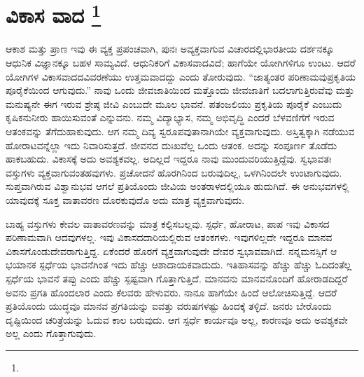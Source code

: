 
\chapter[ವಿಕಾಸ ವಾದ ]{ವಿಕಾಸ ವಾದ \protect\footnote{}}

ಆಕಾಶ ಮತ್ತು ಪ್ರಾಣ ಇವು ಈ ವ್ಯಕ್ತ ಪ್ರಪಂಚವಾಗಿ, ಪುನಃ ಅವ್ಯಕ್ತವಾಗುವ ವಿಚಾರದಲ್ಲಿ\break ಭಾರತೀಯ ದರ್ಶನಕ್ಕೂ ಆಧುನಿಕ ವಿಜ್ಞಾನಕ್ಕೂ ಬಹಳ ಸಾಮ್ಯವಿದೆ. ಆಧುನಿಕರಿಗೆ ವಿಕಾಸ\-ವಾದವಿದೆ; ಹಾಗೆಯೇ ಯೋಗಿಗಳಿಗೂ ಉಂಟು. ಆದರೆ ಯೋಗಿಗಳ ವಿಕಾಸವಾದದ\break ವಿವರಣೆಯು ಉತ್ತಮವಾದದ್ದು ಎಂದು ತೋರುವುದು. “ಜಾತ್ಯಂತರ ಪರಿಣಾಮವು\break ಪ್ರಕೃತಿಯ ಪೂರೈಕೆಯಿಂದ ಆಗುವುದು.” ನಾವು ಒಂದು ಜೀವಜಾತಿಯಿಂದ ಮತ್ತೊಂದು ಜೀವಜಾತಿಗೆ ಬದಲಾಗುತ್ತಿರುವೆವು ಮತ್ತು ಮನುಷ್ಯನೇ ಈಗ ಇರುವ ಶ್ರೇಷ್ಠ ಜೀವಿ ಎಂಬುದೇ ಮೂಲ ಭಾವನೆ. ಪತಂಜಲಿಯು ಪ್ರಕೃತಿಯ ಪೂರೈಕೆ ಎಂಬುದು ಕೃಷಿಕನು\break ನೀರು ಹಾಯಿಸುವಂತೆ ಎನ್ನುವನು. ನಮ್ಮ ವಿದ್ಯಾಭ್ಯಾಸ, ನಮ್ಮ ಅಭಿವೃದ್ಧಿ ಎಂದರೆ ಬೆಳವಣಿಗೆಗೆ ಇರುವ ಆತಂಕವನ್ನು ತೆಗೆದುಹಾಕುವುದು. ಆಗ ನಮ್ಮ ದಿವ್ಯ ಸ್ವರೂಪವು\break ತಾನಾಗಿಯೇ ವ್ಯಕ್ತವಾಗುವುದು. ಅಸ್ತಿತ್ವಕ್ಕಾಗಿ ನಡೆಯುವ ಹೋರಾಟವನ್ನೆಲ್ಲಾ ಇದು ನಿವಾರಿಸುತ್ತದೆ. ಜೀವನದ ದುಃಖವೆಲ್ಲ ಒಂದು ಆತಂಕ. ಅದನ್ನು ಸಂಪೂರ್ಣ ತೊಡೆದು ಹಾಕಬಹುದು. ವಿಕಾಸಕ್ಕೆ ಅದು ಅವಶ್ಯಕವಲ್ಲ. ಅದಿಲ್ಲದೆ ಇದ್ದರೂ ನಾವು ಮುಂದುವರಿಯು\-ತ್ತಿದ್ದೆವು. ಸ್ವಭಾವತಃ ವಸ್ತುಗಳು ವ್ಯಕ್ತವಾಗುವಂತಹವುಗಳು. ಪ್ರಚೋದನೆ ಹೊರಗಿನಿಂದ ಬರುವುದಿಲ್ಲ, ಒಳಗಿನಿಂದಲೇ ಉಂಟಾಗುವುದು. ಸುಪ್ತವಾಗಿರುವ ವಿಶ್ವಾನುಭವ ಆಗಲೆ ಪ್ರತಿಯೊಂದು ಜೀವಿಯ ಅಂತರಾಳದಲ್ಲಿಯೂ ಹುದುಗಿದೆ. ಈ ಅನುಭವಗಳಲ್ಲಿ ಯಾವುದಕ್ಕೆ ಸೂಕ್ತ ವಾತಾವರಣ ದೊರಕುವುದೊ ಅದು ಮಾತ್ರ ವ್ಯಕ್ತವಾಗುವುದು.

\vskip 6pt

ಬಾಹ್ಯ ವಸ್ತುಗಳು ಕೇವಲ ವಾತಾವರಣವನ್ನು ಮಾತ್ರ ಕಲ್ಪಿಸಬಲ್ಲವು. ಸ್ಪರ್ಧೆ, ಹೋರಾಟ, ಪಾಪ ಇವು ವಿಕಾಸದ ಪರಿಣಾಮವಾಗಿ ಆದವುಗಳಲ್ಲ. ಇವು ವಿಕಾಸದ\break ದಾರಿಯಲ್ಲಿರುವ ಆತಂಕಗಳು. ಇವುಗಳಿಲ್ಲದೇ ಇದ್ದರೂ ಮಾನವ ವಿಕಾಸಗೊಂಡು\break ದೇವರಾಗುತ್ತಿದ್ದ. ಏಕೆಂದರೆ ಹೊರಗೆ ವ್ಯಕ್ತವಾಗುವುದೇ ದೇವರ ಸ್ವಭಾವವಾಗಿದೆ. ನನ್ನ\break ಮನಸ್ಸಿಗೆ ಆ ಭಯಾನಕ ಸ್ಪರ್ಧೆಯ ಭಾವನೆಗಿಂತ ಇದು ಹೆಚ್ಚು ಆಶಾದಾಯಕವಾದುದು. ಇತಿಹಾಸವನ್ನು ಹೆಚ್ಚು ಹೆಚ್ಚು ಓದಿದಂತೆಲ್ಲ ಸ್ಪರ್ಧೆಯ ಭಾವನೆ ತಪ್ಪು ಎಂದು ಹೆಚ್ಚು ಸ್ಪಷ್ಟವಾಗಿ ಗೊತ್ತಾಗುತ್ತಿದೆ. ಮಾನವನು ಮಾನವನೊಂದಿಗೆ ಹೋರಾಡದಿದ್ದರೆ ಅವನು ಪ್ರಗತಿ ಹೊಂದಲಾರ ಎಂದು ಕೆಲವರು ಹೇಳುವರು. ನಾನೂ ಹಾಗೆಯೇ ಹಿಂದೆ ಆಲೋಚಿಸುತ್ತಿದ್ದೆ. ಆದರೆ ಪ್ರತಿಯೊಂದು ಯುದ್ಧವೂ ಮಾನವ ಪ್ರಗತಿಯನ್ನು ಐವತ್ತು ವರುಷಗಳಷ್ಟು ಹಿಂದಕ್ಕೆ ತಳ್ಳಿದೆ. ಜನರು ಬೇರೊಂದು ದೃಷ್ಟಿಯಿಂದ ಚರಿತ್ರೆಯನ್ನು ಓದುವ ಕಾಲ ಬರುವುದು. ಆಗ ಸ್ಪರ್ಧೆ ಕಾರ್ಯವೂ ಅಲ್ಲ, ಕಾರಣವೂ ಅದು ಅವಶ್ಯಕವೇ ಅಲ್ಲ ಎಂದು ಗೊತ್ತಾಗುವುದು.

\vskip 6pt

